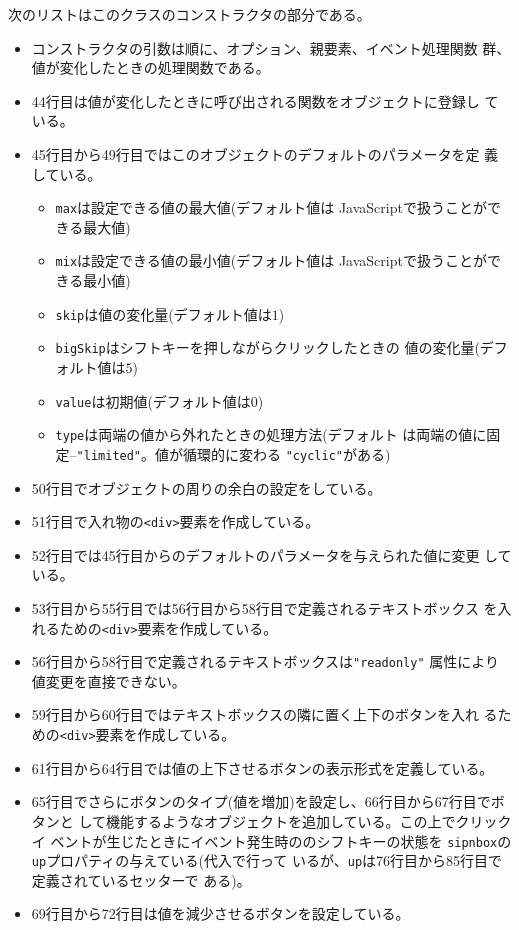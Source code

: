 次のリストはこのクラスのコンストラクタの部分である。
\begin{itemize}
 \item コンストラクタの引数は順に、オプション、親要素、イベント処理関数
       群、値が変化したときの処理関数である。
 \item 44行目は値が変化したときに呼び出される関数をオブジェクトに登録し
       ている。
 \item 45行目から49行目ではこのオブジェクトのデフォルトのパラメータを定
       義している。
       \begin{itemize}
        \item \texttt{max}は設定できる値の最大値(デフォルト値は
              JavaScriptで扱うことができる最大値)
        \item \texttt{mix}は設定できる値の最小値(デフォルト値は
              JavaScriptで扱うことができる最小値)
        \item \texttt{skip}は値の変化量(デフォルト値は$1$)
        \item \texttt{bigSkip}はシフトキーを押しながらクリックしたときの
              値の変化量(デフォルト値は$5$)
        \item \texttt{value}は初期値(デフォルト値は$0$)
        \item \texttt{type}は両端の値から外れたときの処理方法(デフォルト
              は両端の値に固定--\texttt{"limited"}。値が循環的に変わる
              \texttt{"cyclic"}がある)
       \end{itemize}
 \item 50行目でオブジェクトの周りの余白の設定をしている。
 \item 51行目で入れ物の\texttt{<div>}要素を作成している。
 \item 52行目では45行目からのデフォルトのパラメータを与えられた値に変更
       している。
 \item 53行目から55行目では56行目から58行目で定義されるテキストボックス
       を入れるための\texttt{<div>}要素を作成している。
 \item 56行目から58行目で定義されるテキストボックスは\texttt{"readonly"}
       属性により値変更を直接できない。
 \item 59行目から60行目ではテキストボックスの隣に置く上下のボタンを入れ
       るための\texttt{<div>}要素を作成している。
 \item 61行目から64行目では値の上下させるボタンの表示形式を定義している。
 \item 65行目でさらにボタンのタイプ(値を増加)を設定し、66行目から67行目でボタンと
       して機能するようなオブジェクトを追加している。この上でクリックイ
       ベントが生じたときにイベント発生時ののシフトキーの状態を
       \texttt{sipnbox}の\texttt{up}プロパティの与えている(代入で行って
       いるが、\texttt{up}は76行目から85行目で定義されているセッターで
       ある)。
 \item 69行目から72行目は値を減少させるボタンを設定している。
\end{itemize}
